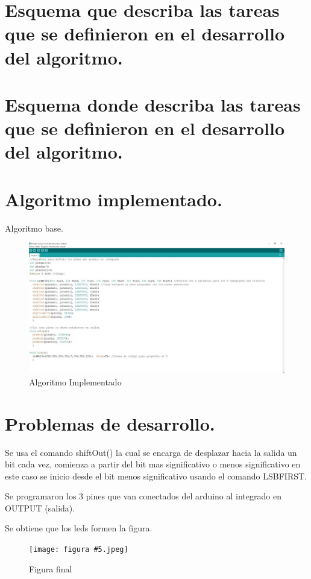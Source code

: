 \documentclass{article}
\begin{document}
\section{Esquema que describa las tareas que se definieron en el desarrollo del algoritmo.}\label{intro}



\section{Esquema donde describa las tareas que se definieron en el desarrollo del algoritmo.}\label{intro}

\newpage
\section{Algoritmo implementado.}\label{intro}
Algoritmo base.
\begin{figure}[h]
\includegraphics[width=12cm]{Algoritmo.jpeg}
\centering
\caption{Algoritmo Implementado}
\label{fig:Algoritmo}
\end{figure}

\newpage
\section{Problemas de desarrollo.}\label{intro}
Se usa el comando shiftOut() la cual se encarga de desplazar hacia la salida un bit cada vez, comienza a partir del bit mas significativo o menos significativo en este caso se inicio desde el bit  menos significativo usando el comando LSBFIRST.

Se programaron los 3 pines que van conectados del arduino al integrado en OUTPUT (salida).

Se obtiene que los leds formen la figura.

\begin{figure}[h]
\texttt{[image: figura \#5.jpeg]}
\centering
\caption{Figura final}
\label{fig:figura #5}
\end{figure}
\end{document}
